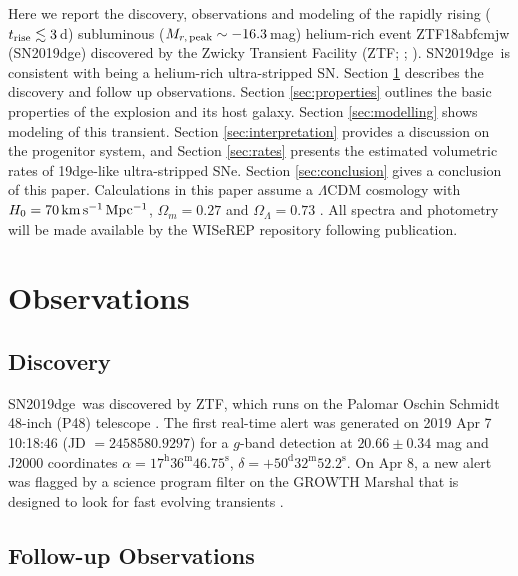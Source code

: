 \documentclass[twocolumn]{aastex63}
\newcommand{\name}{SN2019dge}
\begin{document}
Here we report the discovery, observations and modeling of the rapidly rising ($t_{\rm rise}\lesssim 
3$\,d) subluminous ($M_{r\rm ,\, peak} \sim -16.3$\,mag) helium-rich event ZTF18abfcmjw (SN2019dge) 
discovered by the Zwicky Transient Facility (ZTF; \citealt{Bellm2019b};  \citealt{Graham2019}). \name\ 
is consistent with being a helium-rich ultra-stripped SN. Section \ref{sec:obs} describes 
the discovery and follow up observations. Section 
\ref{sec:properties} outlines the basic properties of the explosion and its host galaxy. Section 
\ref{sec:modelling} shows modeling of this transient. Section 
\ref{sec:interpretation} provides a discussion on the progenitor system, and Section \ref{sec:rates} 
presents the estimated volumetric rates of 19dge-like ultra-stripped SNe. Section \ref{sec:conclusion} 
gives a conclusion of this paper. Calculations in this paper assume a $\Lambda$CDM 
cosmology with $H_0= 70 \, \rm km \, s^{-1}\, 
Mpc^{-1}$, $\Omega_m = 0.27$ and $\Omega_{\Lambda} = 0.73$ \citep{Komatsu2011}. 
All spectra and photometry will be made available by the WISeREP repository \citep{Yaron2012} 
following publication.

\section{Observations}  \label{sec:obs}
\subsection{Discovery}

\name\ was discovered by ZTF, which runs on the Palomar Oschin Schmidt 48-inch (P48) 
telescope \citep{Dekany2020}. The first real-time alert \citep{Patterson2019} was generated on 2019 
Apr 7 10:18:46 (JD $=2458580.9297$) for a $g$-band detection at $20.66\pm0.34$ mag and J2000 
coordinates $\alpha = 17^{\mathrm{h}}36^{\mathrm{m}}46.75^{\mathrm{s}}$, $\delta = 
+50^{\mathrm{d}}32^{\mathrm{m}}52.2^{\mathrm{s}}$.
On Apr 8, a new alert was flagged by a science program filter on the 
GROWTH Marshal \citep{Kasliwal2019} that is designed to look for fast evolving transients 
\citep{Ho2020ZTF20aajnksq}. 

\subsection{Follow-up Observations}
\end{document}
